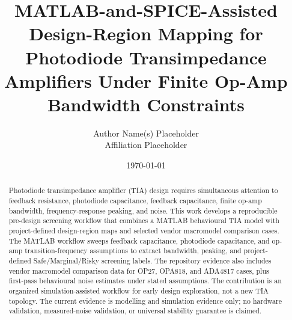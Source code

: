 \documentclass[11pt]{article}
\title{MATLAB-and-SPICE-Assisted Design-Region Mapping for Photodiode Transimpedance Amplifiers Under Finite Op-Amp Bandwidth Constraints}
\author{Author Name(s) Placeholder\\Affiliation Placeholder}
\date{\today}
\begin{document}
\maketitle

\begin{abstract}
Photodiode transimpedance amplifier (TIA) design requires simultaneous attention to feedback resistance, photodiode capacitance, feedback capacitance, finite op-amp bandwidth, frequency-response peaking, and noise. This work develops a reproducible pre-design screening workflow that combines a MATLAB behavioural TIA model with project-defined design-region maps and selected vendor macromodel comparison cases. The MATLAB workflow sweeps feedback capacitance, photodiode capacitance, and op-amp transition-frequency assumptions to extract bandwidth, peaking, and project-defined Safe/Marginal/Risky screening labels. The repository evidence also includes vendor macromodel comparison data for OP27, OPA818, and ADA4817 cases, plus first-pass behavioural noise estimates under stated assumptions. The contribution is an organized simulation-assisted workflow for early design exploration, not a new TIA topology. The current evidence is modelling and simulation evidence only; no hardware validation, measured-noise validation, or universal stability guarantee is claimed.
\end{abstract}










\end{document}
